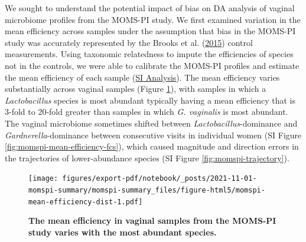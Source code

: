 \documentclass[
]{article}
\begin{document}
We sought to understand the potential impact of bias on DA analysis of vaginal microbiome profiles from the MOMS-PI study.
We first examined variation in the mean efficiency across samples under the assumption that bias in the MOMS-PI study was accurately represented by the Brooks et al. (\protect\hyperlink{ref-brooks2015thet}{2015}) control measurements.
Using taxonomic relatedness to impute the efficiencies of species not in the controls, we were able to calibrate the MOMS-PI profiles and estimate the mean efficiency of each sample
(\href{https://mikemc.github.io/differential-abundance-theory/notebook/posts/2021-11-01-momspi-summary/}{SI Analysis}).
The mean efficiency varies substantially across vaginal samples (Figure \ref{fig:momspi-mean-efficiency-dist}), with samples in which a \emph{Lactobacillus} species is most abundant typically having a mean efficiency that is 3-fold to 20-fold greater than samples in which \emph{G. vaginalis} is most abundant.
The vaginal microbiome sometimes shifted between \emph{Lactobacillus}-dominance and \emph{Gardnerella}-dominance between consecutive visits in individual women (SI Figure \ref{fig:momspi-mean-efficiency-fcs}), which caused magnitude and direction errors in the trajectories of lower-abundance species (SI Figure \ref{fig:momspi-trajectory}).

\begin{figure}
\centering
\texttt{[image: figures/export-pdf/notebook/\_posts/2021-11-01-momspi-summary/momspi-summary\_files/figure-html5/momspi-mean-efficiency-dist-1.pdf]}
\caption{\label{fig:momspi-mean-efficiency-dist}\textbf{The mean efficiency in vaginal samples from the MOMS-PI study varies with the most abundant species.}}
\end{figure}
\end{document}
